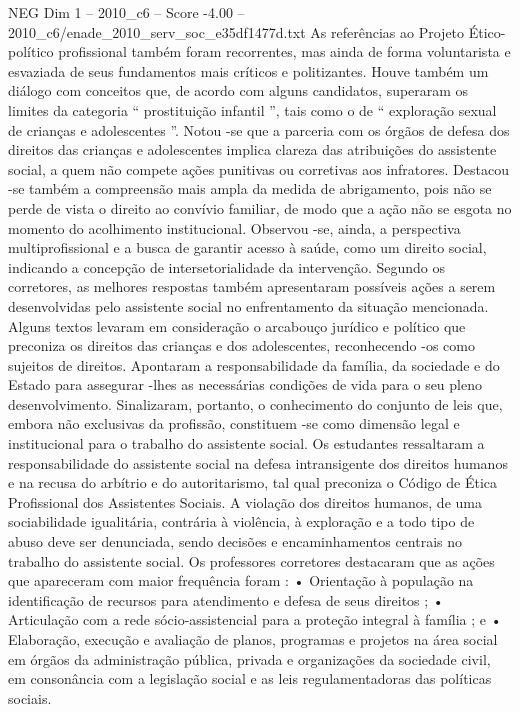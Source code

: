 \begin{textsample}{NEG Dim 1 – 2010\_c6 – Score -4.00 – 2010\_c6/enade\_2010\_serv\_soc\_e35df1477d.txt}
As referências ao Projeto Ético-político profissional também foram recorrentes, mas ainda de forma voluntarista e esvaziada de seus fundamentos mais críticos e politizantes.
Houve também um diálogo com conceitos que, de acordo com alguns candidatos, superaram os limites da categoria “ prostituição infantil ”, tais como o de “ exploração sexual de crianças e adolescentes ”.
Notou -se que a parceria com os órgãos de defesa dos direitos das crianças e adolescentes implica clareza das atribuições do assistente social, a quem não compete ações punitivas ou corretivas aos infratores.
Destacou -se também a compreensão mais ampla da medida de abrigamento, pois não se perde de vista o direito ao convívio familiar, de modo que a ação não se esgota no momento do acolhimento institucional.
Observou -se, ainda, a perspectiva multiprofissional e a busca de garantir acesso à saúde, como um direito social, indicando a concepção de intersetorialidade da intervenção.
Segundo os corretores, as melhores respostas também apresentaram possíveis ações a serem desenvolvidas pelo assistente social no enfrentamento da situação mencionada.
Alguns textos levaram em consideração o arcabouço jurídico e político que preconiza os direitos das crianças e dos adolescentes, reconhecendo -os como sujeitos de direitos.
Apontaram a responsabilidade da família, da sociedade e do Estado para assegurar -lhes as necessárias condições de vida para o seu pleno desenvolvimento.
Sinalizaram, portanto, o conhecimento do conjunto de leis que, embora não exclusivas da profissão, constituem -se como dimensão legal e institucional para o trabalho do assistente social.
Os estudantes ressaltaram a responsabilidade do assistente social na defesa intransigente dos direitos humanos e na recusa do arbítrio e do autoritarismo, tal qual preconiza o Código de Ética Profissional dos Assistentes Sociais.
A violação dos direitos humanos, de uma sociabilidade igualitária, contrária à violência, à exploração e a todo tipo de abuso deve ser denunciada, sendo decisões e encaminhamentos centrais no trabalho do assistente social.
Os professores corretores destacaram que as ações que apareceram com maior frequência foram : • Orientação à população na identificação de recursos para atendimento e defesa de seus direitos ; • Articulação com a rede sócio-assistencial para a proteção integral à família ; e • Elaboração, execução e avaliação de planos, programas e projetos na área social em órgãos da administração pública, privada e organizações da sociedade civil, em consonância com a legislação social e as leis regulamentadoras das políticas sociais.

\end{textsample}

